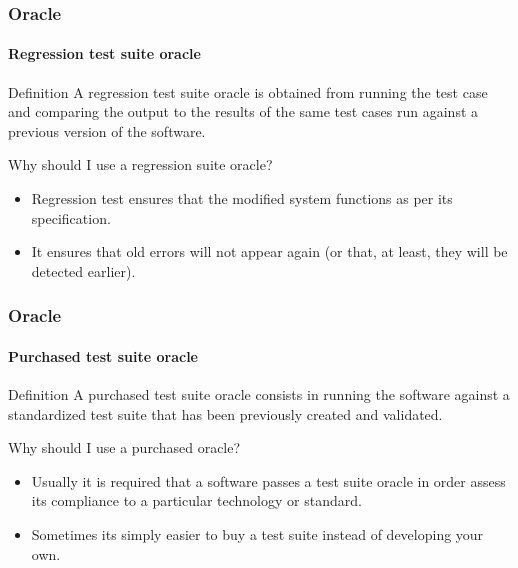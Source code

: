 \begin{frame}
\label{concept:regression-test-suite-oracle}
\frametitle{Oracle}
\framesubtitle{Regression test suite oracle}

\begin{block:concept}{Definition}
A regression test suite oracle  is obtained from running the test case and
comparing the output to the results of the same test cases run against a
previous version of the software.
\end{block:concept}

\begin{block:fact}{Why should I use a regression suite oracle?}
\begin{itemize}
	\item Regression test ensures that the modified system functions as per
	its specification.

	\item It ensures that old errors will not appear again (or that, at least,
	they will be detected earlier).
\end{itemize}
\end{block:fact}


\hfill
{}
\end{frame}



\begin{frame}
\label{concept:purchased-test-suite-oracle}
\frametitle{Oracle}
\framesubtitle{Purchased test suite oracle}

\begin{block:concept}{Definition}
A purchased test suite oracle consists in running the software against a
standardized test suite that has been previously created and validated.
\end{block:concept}

\begin{block:fact}{Why should I use a purchased oracle?}
\begin{itemize}
	\item Usually it is required that a software passes a test suite oracle
	in order assess its compliance to a particular technology or standard.

	\item Sometimes its simply easier to buy a test suite instead of developing
	your own.
\end{itemize}
\end{block:fact}


\hfill
{}
\end{frame}
